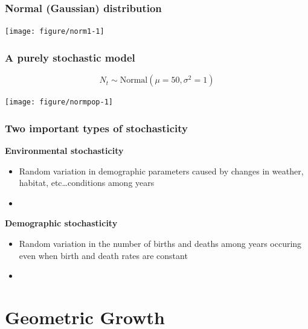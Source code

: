 \documentclass[color=usenames,dvipsnames]{beamer}\usepackage[]{graphicx}\usepackage[]{xcolor}
\begin{document}
\begin{frame}[fragile]
  \frametitle{Normal (Gaussian) distribution}
  \vspace{-0.7cm}
  \begin{center}

  \end{center}
\texttt{[image: figure/norm1-1]}
\end{frame}





\begin{frame}[fragile]
  \frametitle{A purely stochastic model}
  \vspace{-3mm}
  \[
    N_t \sim \mbox{Normal}(\mu=50, \sigma^2=1)
  \]
  \vspace{-8mm}

\begin{center}
  \texttt{[image: figure/normpop-1]}
\end{center}
\end{frame}



\begin{frame}
  \frametitle{Two important types of stochasticity}
  {\bf Environmental stochasticity}
  \begin{itemize}
    \item Random variation in demographic parameters caused by
      changes in weather, habitat, etc\dots conditions among years  
    \item[]
  \end{itemize}
  \pause
  {\bf Demographic stochasticity}
  \begin{itemize}
    \item Random variation in the number of births and deaths among
      years occuring even when birth and death rates are constant
    \item[]
  \end{itemize}
\end{frame}







\section{Geometric Growth}
\end{document}
